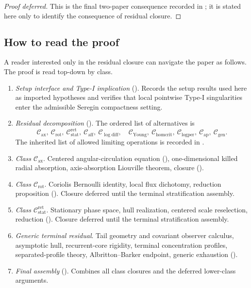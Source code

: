 \documentclass[11pt]{amsart}
\numberwithin{equation}{section}
\theoremstyle{plain}
\theoremstyle{definition}
\theoremstyle{remark}
\newcommand{\Cax}{\mathcal C_{\mathrm{ax}}}
\newcommand{\Crot}{\mathcal C_{\mathrm{rot}}}
\newcommand{\Cstat}{\mathcal C_{\mathrm{stat}}^{\mathrm{ret}}}
\newcommand{\Caff}{\mathcal C_{\mathrm{aff}}}
\newcommand{\Cgen}{\mathcal C_{\mathrm{gen}}}
\newcommand{\Chomcrit}{\mathcal C_{\mathrm{homcrit}}}
\newcommand{\Clogper}{\mathcal C_{\mathrm{logper}}}
\newcommand{\Capcrit}{\mathcal C_{\mathrm{ap}}}
\newcommand{\Cyoung}{\mathcal C_{\mathrm{Young}}}
\newcommand{\Clogdiff}{\mathcal C_{\log\mathrm{diff}}}
\begin{document}
\begin{proof}[Proof deferred]
This is the final two-paper consequence recorded in
; it is stated here only to identify
the consequence of residual closure.
\end{proof}

\subsection{How to read the proof}
\label{subsec:reading-guide}

A reader interested only in the residual closure can navigate the paper as
follows.  The proof is read top-down by class.

\begin{enumerate}[label=\textup{(\arabic*)},leftmargin=2.2em]
   \item \emph{Setup interface and Type-I implication}
   (). Records the
   setup results used here as imported hypotheses and verifies that local pointwise
   Type-I singularities enter the admissible Seregin compactness setting.
   \item \emph{Residual decomposition} ().
   The ordered list of alternatives is
   \[
      \Cax,\ \Crot,\ \Cstat,\ \Caff,\ \Clogdiff,\quad
      \Cyoung,\ \Chomcrit,\ \Clogper,\ \Capcrit,\ \Cgen .
   \]
   The inherited list of allowed limiting operations is recorded in
   .
   \item \emph{Class \(\Cax\)}. Centered angular-circulation equation
   (), one-dimensional killed radial
   absorption, axis-absorption Liouville theorem, closure
   ().
   \item \emph{Class \(\Crot\)}. Coriolis Bernoulli identity, local flux
   dichotomy, reduction proposition
   ().  Closure deferred until the terminal
   stratification assembly.
   \item \emph{Class \(\Cstat\)}. Stationary phase space, hull realization,
   centered scale reselection, reduction
   ().
   Closure deferred until the terminal stratification assembly.
   \item \emph{Generic terminal residual}. Tail geometry and covariant observer
   calculus, asymptotic hull, recurrent-core rigidity, terminal concentration
   profiles, separated-profile theory, Albritton--Barker endpoint, generic
   exhaustion ().
   \item \emph{Final assembly} (). Combines all
   class closures and the deferred lower-class arguments.
\end{enumerate}
\end{document}
